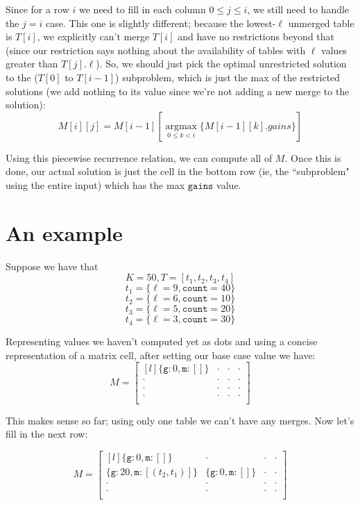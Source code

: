 \documentclass{article}[12]
\begin{document}
Since for a row $i$ we need to fill in each column $0 \le j \le i$, we still need to handle the $j = i$ case. This one is slightly different; because the lowest-$\ell$ unmerged table is $T[i]$, we explicitly can't merge $T[i]$ and have no restrictions beyond that (since our restriction says nothing about the availability of tables with $\ell$ values greater than $T[j].\ell$). So, we should just pick the optimal unrestricted solution to the ($T[0]$ to $T[i-1]$) subproblem, which is just the max of the restricted solutions (we add nothing to its value since we're not adding a new merge to the solution):
$$M[i][j] = M[i-1][\underset{0 \le k < i}{\operatorname{argmax}} \{ M[i-1][k].gains \}]$$

Using this piecewise recurrence relation, we can compute all of $M$. Once this is done, our actual solution is just the cell in the bottom row (ie, the ``subproblem" using the entire input) which has the max $\texttt{gains}$ value.

\section{An example}
Suppose we have that
$$K = 50, T = [ t_1, t_2, t_3, t_4 ]$$
$$t_1 = \{ \ell = 9, \texttt{count} = 40 \}$$
$$t_2 = \{ \ell = 6, \texttt{count} = 10 \}$$
$$t_3 = \{ \ell = 5, \texttt{count} = 20 \}$$
$$t_4 = \{ \ell = 3, \texttt{count} = 30 \}$$

Representing values we haven't computed yet as dots and using a concise representation of a matrix cell, after setting our base case value we have:
\[ M = \begin{bmatrix*}[l]
\{ \texttt{g}: 0, \texttt{m}: []\} & \cdot & \cdot & \cdot\\
\cdot & \cdot & \cdot & \cdot\\
\cdot & \cdot & \cdot & \cdot\\
\cdot & \cdot & \cdot & \cdot\\
\end{bmatrix*} \]

This makes sense so far; using only one table we can't have any merges. Now let's fill in the next row:

\[ M = \begin{bmatrix*}[l]
\{ \texttt{g}: 0, \texttt{m}: []\} & \cdot & \cdot & \cdot\\
\{ \texttt{g}: 20, \texttt{m}: [(t_2, t_1)]\} & \{ \texttt{g}: 0, \texttt{m}: []\} & \cdot & \cdot\\
\cdot & \cdot & \cdot & \cdot\\
\cdot & \cdot & \cdot & \cdot\\
\end{bmatrix*} \]
\end{document}
